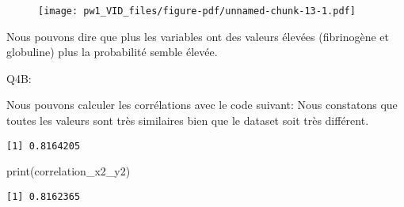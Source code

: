 \documentclass[
  letterpaper,
  DIV=11,
  numbers=noendperiod]{scrartcl}
\newenvironment{Shaded}{}{}
\newcommand{\FunctionTok}[1]{\textcolor[rgb]{0.44,0.26,0.76}{#1}}
\newcommand{\NormalTok}[1]{\textcolor[rgb]{0.14,0.16,0.18}{#1}}
\newcommand{\OtherTok}[1]{\textcolor[rgb]{0.44,0.26,0.76}{#1}}
\newcommand{\SpecialCharTok}[1]{\textcolor[rgb]{0.00,0.36,0.77}{#1}}
\begin{document}
\begin{figure}[H]

{\centering \texttt{[image: pw1\_VID\_files/figure-pdf/unnamed-chunk-13-1.pdf]}

}

\end{figure}

Nous pouvons dire que plus les variables ont des valeurs élevées
(fibrinogène et globuline) plus la probabilité semble élevée.

Q4B:

Nous pouvons calculer les corrélations avec le code suivant: Nous
constatons que toutes les valeurs sont très similaires bien que le
dataset soit très différent.

\begin{Shaded}
\end{Shaded}

\begin{verbatim}
[1] 0.8164205
\end{verbatim}

\begin{Shaded}
\begin{Highlighting}[]
\FunctionTok{print}\NormalTok{(correlation\_x2\_y2)}
\end{Highlighting}
\end{Shaded}

\begin{verbatim}
[1] 0.8162365
\end{verbatim}
\end{document}
